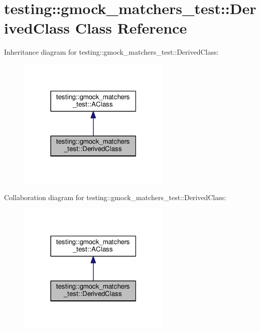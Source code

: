 \hypertarget{classtesting_1_1gmock__matchers__test_1_1DerivedClass}{}\section{testing\+:\+:gmock\+\_\+matchers\+\_\+test\+:\+:Derived\+Class Class Reference}
\label{classtesting_1_1gmock__matchers__test_1_1DerivedClass}


Inheritance diagram for testing\+:\+:gmock\+\_\+matchers\+\_\+test\+:\+:Derived\+Class\+:
\nopagebreak
\begin{figure}[H]
\begin{center}
\leavevmode
\includegraphics[width=207pt]{classtesting_1_1gmock__matchers__test_1_1DerivedClass__inherit__graph}
\end{center}
\end{figure}


Collaboration diagram for testing\+:\+:gmock\+\_\+matchers\+\_\+test\+:\+:Derived\+Class\+:
\nopagebreak
\begin{figure}[H]
\begin{center}
\leavevmode
\includegraphics[width=207pt]{classtesting_1_1gmock__matchers__test_1_1DerivedClass__coll__graph}
\end{center}
\end{figure}
